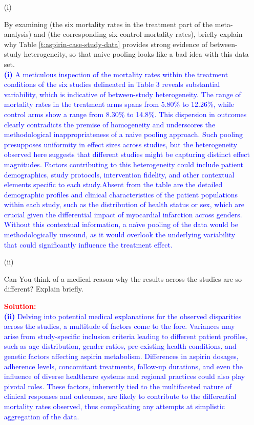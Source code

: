 \documentclass[12pt]{article}
\newcommand{\bi}[1]{\b{\i{#1}}}
\renewcommand{\b}[1]{\textbf{#1}}
\renewcommand{\i}[1]{\textit{#1}}
\begin{document}
\begin{itemize}
\begin{itemize}

\item[(i)]

\vspace*{0.025in} By examining (the six mortality rates in the treatment part of the meta-analysis) and (the corresponding six control mortality rates), briefly explain why Table \ref{t:aspirin-case-study-data} provides strong evidence of between-study heterogeneity, so that naive pooling looks like a bad idea with this data set. \fbox{\bi{[10 points]}} \\ 

\textcolor{blue}{\textbf{(i)} A meticulous inspection of the mortality rates within the treatment conditions of the six studies delineated in Table 3 reveals substantial variability, which is indicative of between-study heterogeneity. The range of mortality rates in the treatment arms spans from 5.80\% to 12.26\%, while control arms show a range from 8.30\% to 14.8\%. This dispersion in outcomes clearly contradicts the premise of homogeneity and underscores the methodological inappropriateness of a naive pooling approach. Such pooling presupposes uniformity in effect sizes across studies, but the heterogeneity observed here suggests that different studies might be capturing distinct effect magnitudes. Factors contributing to this heterogeneity could include patient demographics, study protocols, intervention fidelity, and other contextual elements specific to each study.Absent from the table are the detailed demographic profiles and clinical characteristics of the patient populations within each study, such as the distribution of health status or sex, which are crucial given the differential impact of myocardial infarction across genders. Without this contextual information, a naïve pooling of the data would be methodologically unsound, as it would overlook the underlying variability that could significantly influence the treatment effect.}

\item[(ii)]

Can You think of a medical reason why the results across the studies are so different? Explain briefly. \fbox{\bi{[10 points]}}

\textcolor{red}{\textbf{Solution:}} \\
\textcolor{blue}{
\textbf{(ii)} Delving into potential medical explanations for the observed disparities across the studies, a multitude of factors come to the fore. Variances may arise from study-specific inclusion criteria leading to different patient profiles, such as age distribution, gender ratios, pre-existing health conditions, and genetic factors affecting aspirin metabolism. Differences in aspirin dosages, adherence levels, concomitant treatments, follow-up durations, and even the influence of diverse healthcare systems and regional practices could also play pivotal roles. These factors, inherently tied to the multifaceted nature of clinical responses and outcomes, are likely to contribute to the differential mortality rates observed, thus complicating any attempts at simplistic aggregation of the data.
}


\end{itemize}
\end{itemize}
\end{document}
